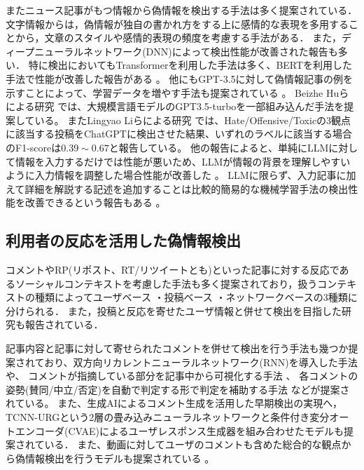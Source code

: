 またニュース記事がもつ情報から偽情報を検出する手法は多く提案されている．
文字情報からは，偽情報が独自の書かれ方をする上に感情的な表現を多用することから，文章のスタイル\cite{potthast-etal-2018-stylometric}や感情的表現の頻度\cite{DBLP:journals/corr/abs-1903-01728}を考慮する手法がある．
また，ディープニューラルネットワーク(DNN)によって検出性能が改善された報告\cite{wang-2017-liar,karimi-tang-2019-learning,karimi-etal-2018-multi}も多い．
特に検出においてもTransformerを利用した手法は多く、BERTを利用した手法で性能が改善した報告がある \cite{Kaliyar2021,yanagi2021classifying}。
他にもGPT-3.5に対して偽情報記事の例を示すことによって、学習データを増やす手法も提案されている \cite{lucas-etal-2023-fighting}。
Beizhe Huらによる研究 \cite{Hu_Sheng_Cao_Shi_Li_Wang_Qi_2024}では、大規模言語モデルのGPT3.5-turboを一部組み込んだ手法を提案している。
またLingyao Liらによる研究 \cite{10.1145/3643829}では、Hate/Offensive/Toxicの3観点に該当する投稿をChatGPTに検出させた結果、いずれのラベルに該当する場合のF1-scoreは$0.39 \sim 0.67$と報告している。
他の報告によると、単純にLLMに対して情報を入力するだけでは性能が悪いため、LLMが情報の背景を理解しやすいように入力情報を調整した場合性能が改善した \cite{doi:10.1137/1.9781611978032.50}。
LLMに限らず、入力記事に加えて詳細を解説する記述を追加することは比較的簡易的な機械学習手法の検出性能を改善できるという報告もある \cite{Bonet-Jover2024}。

\subsection{利用者の反応を活用した偽情報検出}
コメントやRP(リポスト、RT/リツイートとも)といった記事に対する反応であるソーシャルコンテキストを考慮した手法も多く提案されており，扱うコンテキストの種類によってユーザベース\cite{Castillo:2011:ICT:1963405.1963500,8397048,DBLP:journals/corr/abs-1904-13355}
・投稿ベース\cite{Yang_Shu_Wang_Gu_Wu_Liu_2019,Tacchini2017SomeLI,Jin:2016:NVE:3016100.3016318}
・ネットワークベース\cite{Wu:2018:TFF:3159652.3159677,DBLP:journals/corr/abs-1902-06673}の3種類に分けられる．
また，投稿と反応を寄せたユーザ情報と併せて検出を目指した研究も報告されている\cite{10.1145/3386253}．

記事内容と記事に対して寄せられたコメントを併せて検出を行う手法も幾つか提案されており、双方向リカレントニューラルネットワーク(RNN)を導入した手法や\cite{https://doi.org/10.1049/ise2.12021}、
コメントが指摘している部分を記事中から可視化する手法 \cite{10.1145/3292500.3330935}、
各コメントの姿勢(賛同/中立/否定)を自動で判定する形で判定を補助する手法 \cite{9414787} などが提案されている。
また、生成AIによるコメント生成を活用した早期検出の実現へ，TCNN-URGという2層の畳み込みニューラルネットワークと条件付き変分オートエンコーダ(CVAE)によるユーザレスポンス生成器を組み合わせたモデルも提案されている\cite{ijcai2018-533}．
また、動画に対してユーザのコメントも含めた総合的な観点から偽情報検出を行うモデルも提案されている \cite{zong-etal-2024-unveiling}。

